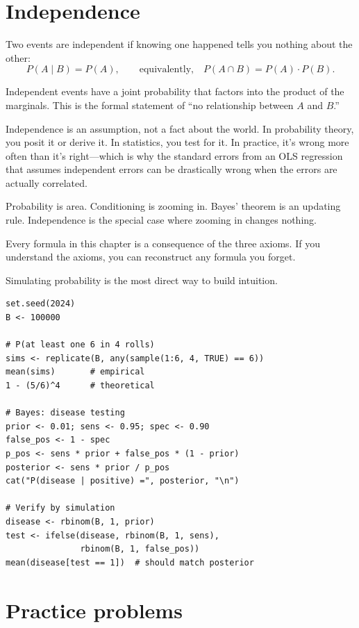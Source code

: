 \section{Independence}

Two events are independent if knowing one happened tells you nothing about the other:
\[
  P(A \mid B) = P(A), \qquad \text{equivalently,} \quad P(A \cap B) = P(A) \cdot P(B).
\]

Independent events have a joint probability that factors into the product of the marginals. This is the formal statement of ``no relationship between $A$ and $B$.''

Independence is an assumption, not a fact about the world. In probability theory, you posit it or derive it. In statistics, you test for it. In practice, it's wrong more often than it's right---which is why the standard errors from an OLS regression that assumes independent errors can be drastically wrong when the errors are actually correlated.

\begin{keyinsight}
Probability is area. Conditioning is zooming in. Bayes' theorem is an updating rule. Independence is the special case where zooming in changes nothing.

Every formula in this chapter is a consequence of the three axioms. If you understand the axioms, you can reconstruct any formula you forget.
\end{keyinsight}

\begin{codelab}
Simulating probability is the most direct way to build intuition.
\begin{lstlisting}[language=Rlang]
set.seed(2024)
B <- 100000

# P(at least one 6 in 4 rolls)
sims <- replicate(B, any(sample(1:6, 4, TRUE) == 6))
mean(sims)       # empirical
1 - (5/6)^4      # theoretical

# Bayes: disease testing
prior <- 0.01; sens <- 0.95; spec <- 0.90
false_pos <- 1 - spec
p_pos <- sens * prior + false_pos * (1 - prior)
posterior <- sens * prior / p_pos
cat("P(disease | positive) =", posterior, "\n")

# Verify by simulation
disease <- rbinom(B, 1, prior)
test <- ifelse(disease, rbinom(B, 1, sens),
               rbinom(B, 1, false_pos))
mean(disease[test == 1])  # should match posterior
\end{lstlisting}
\end{codelab}

\section{Practice problems}

